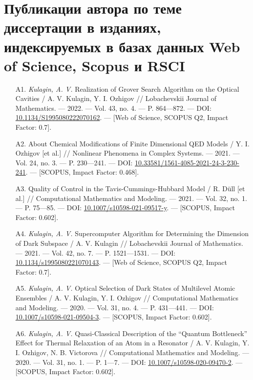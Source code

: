 \clearpage

\chapter*{
	Публикации автора по теме диссертации в изданиях, индексируемых в базах данных Web of Science, Scopus и RSCI
}
\vspace{-1em}
\hypersetup{urlcolor=blue}
{\seminormalsize
\begin{itemize}[leftmargin=24pt]
	\item[A1.]{\textit{Kulagin, A. V.} Realization of Grover Search Algorithm on the Opti­cal Cavities / A. V. Kulagin, Y. I. Ozhigov // Lobachevskii Journal of Mathematics. — 2022. — Vol. 43, no. 4. — P. 864—872. — DOI: \href{https://doi.org/10.1134/S1995080222070162}{10.1134/S1995080222070162}. — [Web of Science, SCOPUS Q2, Impact Factor: 0.7].}
	\item[A2.]{About Chemical Modifications of Finite Dimensional QED Models / Y. I. Ozhigov [et al.] // Nonlinear Phenomena in Complex Systems. — 2021. — Vol. 24, no. 3. — P. 230—241. — DOI: \href{https://doi.org/10.33581/1561-4085-2021-24-3-230-241}{10.33581/1561-4085-2021-24-3-230-241}. — [SCOPUS, Impact Factor: 0.468].}
	\item[A3.]{Quality of Control in the Tavis-Cummings-Hubbard Model / R. Düll [et al.] // Computational Mathematics and Modeling. — 2021. — Vol. 32, no. 1. — P. 75—85. — DOI: \href{https://doi.org/10.1007/s10598-021-09517-y}{10.1007/s10598-021-09517-y}. — [SCOPUS, Impact Factor: 0.602].}
	\item[A4.]{\textit{Kulagin, A. V.} Supercomputer Algorithm for Determining the Dimension of Dark Subspace / A. V. Kulagin // Lobachevskii Journal of Mathemat­ics. — 2021. — Vol. 42, no. 7. — P. 1521—1531. — DOI: \href{https://doi.org/10.1134/s1995080221070143}{10.1134/s1995080221070143}. — [Web of Science, SCOPUS Q2, Impact Factor: 0.7].}
	\item[A5.]{\textit{Kulagin, A. V.} Optical Selection of Dark States of Multilevel Atomic Ensembles / A. V. Kulagin, Y. I. Ozhigov // Computational Mathematics and Modeling. — 2020. — Vol. 31, no. 4. — P. 431—441. — DOI: \href{https://doi.org/10.1007/s10598-021-09504-3}{10.1007/s10598-021-09504-3}. — [SCOPUS, Impact Factor: 0.602].}
	\item[A6.]{\textit{Kulagin, A. V.} Quasi-Classical Description of the ``Quantum Bottleneck'' Effect for Thermal Relaxation of an Atom in a Resonator / A. V. Kulagin, Y. I. Ozhigov, N. B. Victorova // Computational Mathematics and Mod­eling. — 2020. — Vol. 31, no. 1. — P. 1—7. — DOI: \href{https://doi.org/10.1007/s10598-020-09470-2}{10.1007/s10598-020-09470-2}. — [SCOPUS, Impact Factor: 0.602].}
\end{itemize}
}
